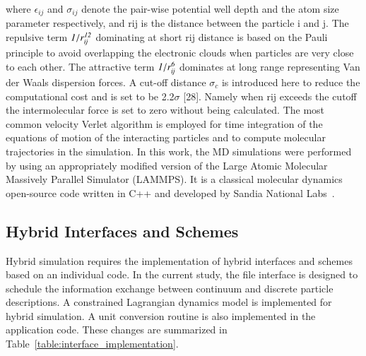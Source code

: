 \documentclass[preprint,12pt]{elsarticle}
\newcommand{\Nkimnote}[1]{ {\textcolor{blue} { ***NKim: #1 }}}
\newcommand{\Nkimnote}[1]{}
\begin{document}
where  $\epsilon_{ij}$ and $\sigma_{ij}$ denote the pair-wise potential well depth and the atom size parameter respectively, and rij is the distance between the particle i and j. The repulsive term $\it 1/r_{ij}^{12}$ dominating at short rij distance is based on the Pauli principle to avoid overlapping the electronic clouds when particles are very close to each other. The attractive term $\it 1/r_{ij}^{6}$ dominates at long range representing Van der Waals dispersion forces. A cut-off distance $\sigma_{c}$  is introduced here to reduce the computational cost and is set to be 2.2$\sigma$  [28]. Namely when rij exceeds the cutoff the intermolecular force is set to zero without being calculated.
The most common velocity Verlet algorithm is employed for time integration of the equations of motion of the interacting particles and to compute molecular trajectories in the simulation. 
In this work, the MD simulations were performed by using an appropriately modified version of the Large Atomic Molecular Massively Parallel Simulator (LAMMPS). It is a classical molecular dynamics open-source code written in C++ and developed by Sandia National Labs~\cite{LAMMPS_url}.


\subsection{Hybrid Interfaces and Schemes}
\label{sec:numerical_hybridschemes}

Hybrid simulation requires the implementation of hybrid interfaces and schemes based on an individual code. In the current study, the file interface is designed to schedule the information exchange between continuum and discrete particle descriptions. A constrained Lagrangian dynamics model is implemented for hybrid simulation. A unit conversion routine is also implemented in the application code. These changes are summarized in Table~\ref{table:interface_implementation}. 
\end{document}
